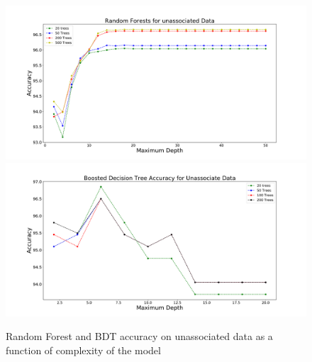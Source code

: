 \begin{figure}[h]
\includegraphics[width=\twopicsp\textwidth]{plots/unassoc2.pdf}
\includegraphics[width=\twopicsp\textwidth]{plots/unassoc_complex.pdf}
\caption{Random Forest and BDT accuracy on unassociated data as a function of complexity of the model}
\label{fig:Maps_data}
\end{figure}

